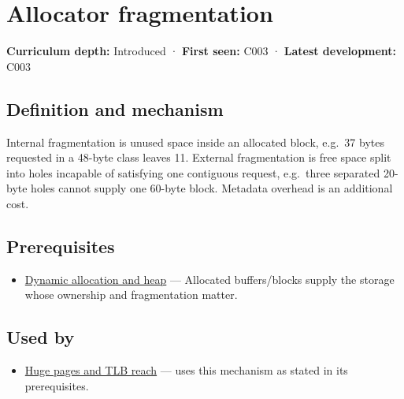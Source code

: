 \hypertarget{appendix-a7c50686d81f}{}\label{referencestart:appendix-a7c50686d81f}
\section{Allocator fragmentation}\label{appendix-a7c50686d81f-allocator-fragmentation}

\textbf{Curriculum depth:} Introduced · \textbf{First seen:} C003 · \textbf{Latest development:} C003

\begin{allmightroledefinition}

\subsection{Definition and mechanism}\label{appendix-a7c50686d81f-definition-and-mechanism}

Internal fragmentation is unused space inside an allocated block, e.g.~37 bytes requested in a 48-byte class leaves 11. External fragmentation is free space split into holes incapable of satisfying one contiguous request, e.g.~three separated 20-byte holes cannot supply one 60-byte block. Metadata overhead is an additional cost.

\end{allmightroledefinition}

\subsection{Prerequisites}\label{appendix-a7c50686d81f-prerequisites}

\begin{itemize}
\tightlist
\item
  \hyperref[appendix-c3480f7d9ff3]{Dynamic allocation and heap} --- Allocated buffers/blocks supply the storage whose ownership and fragmentation matter.
\end{itemize}

\subsection{Used by}\label{appendix-a7c50686d81f-used-by}

\begin{itemize}
\tightlist
\item
  \hyperref[appendix-ce688d1acdab]{Huge pages and TLB reach} --- uses this mechanism as stated in its prerequisites.
\end{itemize}

